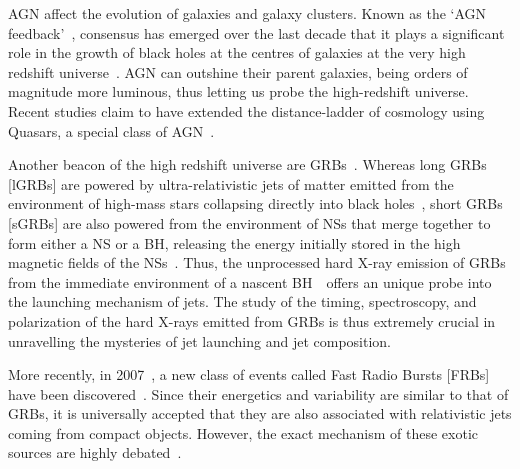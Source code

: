 AGN affect the evolution of galaxies and galaxy clusters. Known as the `AGN feedback' \,\R, consensus has emerged over the last decade that it plays a significant role in the growth of black holes at the centres of galaxies at the very high redshift universe \,\Rlots. AGN can outshine their parent galaxies, being orders of magnitude more luminous, thus letting us probe the high-redshift universe. Recent studies claim to have extended the distance-ladder of cosmology using Quasars, a special class of AGN \,\R.

Another beacon of the high redshift universe are GRBs \,\Rlots. Whereas long GRBs [lGRBs] are powered by ultra-relativistic jets of matter emitted from the environment of high-mass stars collapsing directly into black holes \,\Rlots, short GRBs [sGRBs] are also powered from the environment of NSs that merge together to form either a NS or a BH, releasing the energy initially stored in the high magnetic fields of the NSs \,\Rlots. Thus, the unprocessed hard X-ray emission of GRBs from the immediate environment of a nascent BH \,\R\, offers an unique probe into the launching mechanism of jets. The study of the timing, spectroscopy, and polarization of the hard X-rays emitted from GRBs is thus extremely crucial in unravelling the mysteries of jet launching and jet composition.

More recently, in 2007 \,\R, a new class of events called Fast Radio Bursts [FRBs] have been discovered \,\R. Since their energetics and variability are similar to that of GRBs, it is universally accepted that they are also associated with relativistic jets coming from compact objects. However, the exact mechanism of these exotic sources are highly debated \,\Rlots.
